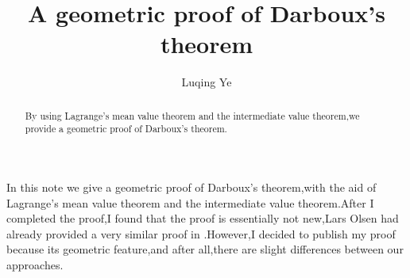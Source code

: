 \documentclass{amsart}
\theoremstyle{plain}
\theoremstyle{definition}
\begin{document}
\title{A geometric proof of Darboux's theorem}
\author{Luqing Ye}
\address{An undergrad at College of Science, Hangzhou Normal University,Hangzhou City,Zhejiang Province,China}

\maketitle

\begin{abstract}
By using Lagrange's mean value theorem and the intermediate value
theorem,we provide a geometric proof of Darboux's theorem.
\end{abstract}


\noindent
In this note we give a geometric proof of Darboux's theorem,with
the aid of Lagrange's mean value theorem and the intermediate value
theorem.After I completed the proof,I found that the proof is
essentially not new,Lars Olsen had already provided a very
similar proof in \cite{Lars}.However,I decided to publish my proof
because its geometric feature,and after all,there are slight
differences between our approaches.
\end{document}
